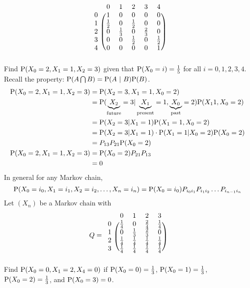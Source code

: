 \documentclass[12pt]{article}
\begin{document}
$$ \begin{blockarray}{cccccc}
&0&1&2&3&4 \\
\begin{block}{c(ccccc)}
  0 & 1 & 0 & 0 & 0 & 0 \\
  1 & \frac{1}{2} & 0 & \frac{1}{2} & 0 & 0 \\
  2 & 0 & \frac{1}{3} & 0 & \frac{2}{3} & 0 \\
  3 & 0 & 0 & \frac{1}{2} & 0 & \frac{1}{2} \\
  4 & 0 & 0 & 0 & 0 & 1 \\
\end{block} \end{blockarray} $$ 
Find $\mathrm{P}( X_0 = 2,X_1=1,X_2=3 )$ given that $\mathrm{P}( X_0 = i ) = \frac{1}{5}$ for all $i = 0,1,2,3,4$. \\
Recall the property: $\mathrm{P}( A \bigcap B ) = \mathrm{P}( A~|~B )\mathrm{P}( B )$.  
$$ \begin{aligned} \mathrm{P}( X_0 = 2,X_1=1,X_2 = 3 ) &= \mathrm{P}( X_2 = 3,X_1=1,X_0=2 ) \\ &= \mathrm{P}( \underbrace{X_2}_{\text{future}} =3 | \underbrace{X_1}_{\text{present}} = 1, \underbrace{X_0}_{\text{past}} = 2 ) \mathrm{P}( X_1 1,X_0=2 ) \\ &= \mathrm{P}( X_2 = 3 | X_1 = 1 ) \mathrm{P}( X_1 =1,X_0=2 ) \\ &= \mathrm{P}( X_2=3 |X_1=1 ) \cdot \mathrm{P}( X_1 = 1 | X_0 =2 )\mathrm{P}( X_0=2 ) \\ &= P_{13}P_{21}\mathrm{P}( X_0=2 ) \\ \mathrm{P}( X_0=2,X_1=1,X_2=3 ) &= \mathrm{P}( X_0=2 )P_{21}P_{13} \\ &= 0 \end{aligned} $$ 
In general for any Markov chain, $$ \mathrm{P}( X_0 = i_0, X_1=i_1,X_2=i_2,\dots,X_n = i_n ) = \mathrm{P}( X_0=i_0 )P_{i_0i_1}P_{i_1i_2}\dots P_{i_{n-1}i_n} $$ 
Let $(X_n)$ be a Markov chain with $$Q = 
 \begin{blockarray}{ccccc}
&0&1&2&3 \\
\begin{block}{c(cccc)}
0 & \frac{1}{4} & 0 & \frac{2}{4} & \frac{1}{4} \\ 
1 & 0 & \frac{1}{3} & \frac{2}{3} & 0 \\
2 & \frac{1}{4} & \frac{1}{4} & \frac{1}{4} & \frac{1}{4} \\
3 & \frac{1}{4} & \frac{1}{4} & \frac{1}{4} & \frac{1}{4} \\ \end{block} \end{blockarray} $$ 
Find $\mathrm{P}( X_0 = 0,X_1=2,X_4=0 )$ if $\mathrm{P}( X_0 = 0 ) = \frac{1}{3}$, $\mathrm{P}( X_0 = 1 ) = \frac{1}{3}$, $\mathrm{P}( X_0=2 ) = \frac{1}{3}$, and $\mathrm{P}( X_0=3 )=0$. \\ 
\end{document}
